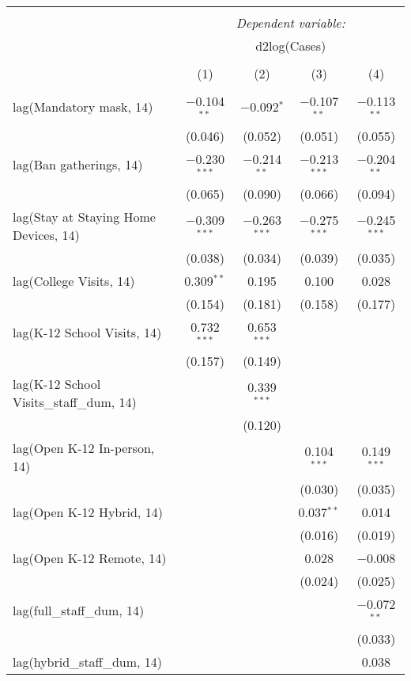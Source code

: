 \begin{tabular}{@{\extracolsep{1pt}}lcccc} 
\\[-1.8ex]\hline 
\hline \\[-1.8ex] 
 & \multicolumn{4}{c}{\textit{Dependent variable:}} \\ 
\cline{2-5} 
 & \multicolumn{4}{c}{d2log(Cases)} \\ 
\\[-1.8ex] & (1) & (2) & (3) & (4)\\ 
\hline \\[-1.8ex] 
 lag(Mandatory mask, 14) & $-$0.104$^{**}$ & $-$0.092$^{*}$ & $-$0.107$^{**}$ & $-$0.113$^{**}$ \\ 
  & (0.046) & (0.052) & (0.051) & (0.055) \\ 
  lag(Ban gatherings, 14) & $-$0.230$^{***}$ & $-$0.214$^{**}$ & $-$0.213$^{***}$ & $-$0.204$^{**}$ \\ 
  & (0.065) & (0.090) & (0.066) & (0.094) \\ 
  lag(Stay at Staying Home Devices, 14) & $-$0.309$^{***}$ & $-$0.263$^{***}$ & $-$0.275$^{***}$ & $-$0.245$^{***}$ \\ 
  & (0.038) & (0.034) & (0.039) & (0.035) \\ 
  lag(College Visits, 14) & 0.309$^{**}$ & 0.195 & 0.100 & 0.028 \\ 
  & (0.154) & (0.181) & (0.158) & (0.177) \\ 
  lag(K-12 School Visits, 14) & 0.732$^{***}$ & 0.653$^{***}$ &  &  \\ 
  & (0.157) & (0.149) &  &  \\ 
  lag(K-12 School Visits\_staff\_dum, 14) &  & 0.339$^{***}$ &  &  \\ 
  &  & (0.120) &  &  \\ 
  lag(Open K-12 In-person, 14) &  &  & 0.104$^{***}$ & 0.149$^{***}$ \\ 
  &  &  & (0.030) & (0.035) \\ 
  lag(Open K-12 Hybrid, 14) &  &  & 0.037$^{**}$ & 0.014 \\ 
  &  &  & (0.016) & (0.019) \\ 
  lag(Open K-12 Remote, 14) &  &  & 0.028 & $-$0.008 \\ 
  &  &  & (0.024) & (0.025) \\ 
  lag(full\_staff\_dum, 14) &  &  &  & $-$0.072$^{**}$ \\ 
  &  &  &  & (0.033) \\ 
  lag(hybrid\_staff\_dum, 14) &  &  &  & 0.038 \\ 

\end{tabular}
